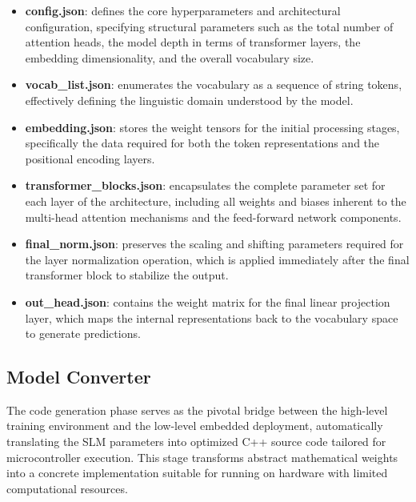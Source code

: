 \documentclass{ieeeaccess}
\begin{document}
\begin{itemize}
    \item \textbf{config.json}: defines the core hyperparameters and architectural configuration, specifying structural parameters such as the total number of attention heads, the model depth in terms of transformer layers, the embedding dimensionality, and the overall vocabulary size.

    \item \textbf{vocab\_list.json}: enumerates the vocabulary as a sequence of string tokens, effectively defining the linguistic domain understood by the model.

    \item \textbf{embedding.json}: stores the weight tensors for the initial processing stages, specifically the data required for both the token representations and the positional encoding layers.

    \item \textbf{transformer\_blocks.json}: encapsulates the complete parameter set for each layer of the architecture, including all weights and biases inherent to the multi-head attention mechanisms and the feed-forward network components.

    \item \textbf{final\_norm.json}: preserves the scaling and shifting parameters required for the layer normalization operation, which is applied immediately after the final transformer block to stabilize the output.

    \item \textbf{out\_head.json}: contains the weight matrix for the final linear projection layer, which maps the internal representations back to the vocabulary space to generate predictions.
\end{itemize}



\subsection{Model Converter}

The code generation phase serves as the pivotal bridge between the high-level training environment and the low-level embedded deployment, automatically translating the SLM parameters into optimized C++ source code tailored for microcontroller execution. This stage transforms abstract mathematical weights into a concrete implementation suitable for running on hardware with limited computational resources.
\end{document}

